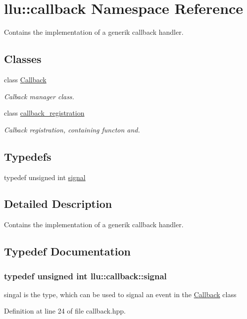\hypertarget{namespacellu_1_1callback}{\section{llu\+:\+:callback Namespace Reference}
\label{namespacellu_1_1callback}
}


Contains the implementation of a generik callback handler.  


\subsection*{Classes}
\begin{DoxyCompactItemize}
\item 
class \hyperlink{classllu_1_1callback_1_1_callback}{Callback}
\begin{DoxyCompactList}\small\item\em Calback manager class. \end{DoxyCompactList}\item 
class \hyperlink{classllu_1_1callback_1_1callback__registration}{callback\+\_\+registration}
\begin{DoxyCompactList}\small\item\em Calback registration, containing functon and. \end{DoxyCompactList}\end{DoxyCompactItemize}
\subsection*{Typedefs}
\begin{DoxyCompactItemize}
\item 
typedef unsigned int \hyperlink{namespacellu_1_1callback_a082ed24306809c4d250bd5ddfbae177f}{signal}
\end{DoxyCompactItemize}


\subsection{Detailed Description}
Contains the implementation of a generik callback handler. 

\subsection{Typedef Documentation}
\hypertarget{namespacellu_1_1callback_a082ed24306809c4d250bd5ddfbae177f}{
\subsubsection[{signal}]{\setlength{\rightskip}{0pt plus 5cm}typedef unsigned int {\bf llu\+::callback\+::signal}}}\label{namespacellu_1_1callback_a082ed24306809c4d250bd5ddfbae177f}
singal is the type, which can be used to signal an event in the \hyperlink{classllu_1_1callback_1_1_callback}{Callback} class 

Definition at line 24 of file callback.\+hpp.

